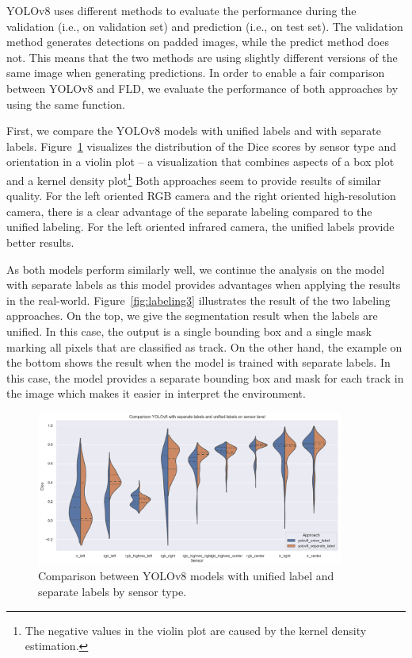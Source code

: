 \documentclass[Master,MDS,english]{BASE/twbook} %
\begin{document}
YOLOv8 uses different methods to evaluate the performance during the validation (i.e., on validation set) and prediction (i.e., on test set). The validation method generates detections on padded images, while the predict method does not. This means that the two methods are using slightly different versions of the same image when generating predictions. In order to enable a fair comparison between YOLOv8 and FLD, we evaluate the performance of both approaches by using the same function.

First, we compare the YOLOv8 models with unified labels and with separate labels. Figure~\ref{fig:yolo_vs_yolo} visualizes the distribution of the Dice scores by sensor type and orientation in a violin plot -- a visualization that combines aspects of a box plot and a kernel density plot\footnote{The negative values in the violin plot are caused by the kernel density estimation.} 
Both approaches seem to provide results of similar quality. 
For the left oriented RGB camera and the right oriented high-resolution camera, there is a clear advantage of the separate labeling compared to the unified labeling. For the left oriented infrared camera, the unified labels provide better results.

As both models perform similarly well, we continue the analysis on the model with separate labels as this model provides advantages when applying the results in the real-world. 
Figure~\ref{fig:labeling3} illustrates the result of the two labeling approaches. 
On the top, we give the segmentation result when the labels are unified. In this case, the output is a single bounding box and a single mask marking all pixels that are classified as track. On the other hand, the example on the bottom shows the result when the model is trained with separate labels. In this case, the model provides a separate bounding box and mask for each track in the image which makes it easier in interpret the environment.

 

\begin{figure}[h]
\centering
\includegraphics[width=0.9\textwidth]{images/results/violin_plot_yolo}
\caption{Comparison between YOLOv8 models with unified label and separate labels by sensor type. }
\label{fig:yolo_vs_yolo}
\end{figure}
\end{document}
